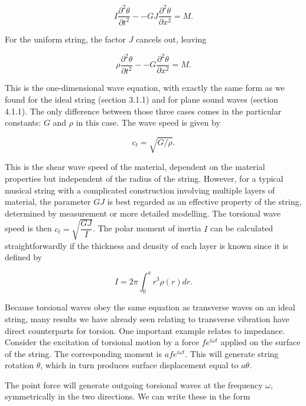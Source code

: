  \begin{equation*}I \dfrac{\partial^2 \theta}{\partial t^2} -- GJ 
  \dfrac{\partial^2 \theta}{\partial x^2}= M . \tag{3}\end{equation*} 

  For the uniform string, the factor $J$ cancels out, leaving 

  \begin{equation*}\rho \dfrac{\partial^2 \theta}{\partial t^2} -- G 
  \dfrac{\partial^2 \theta}{\partial x^2}= M . \tag{4}\end{equation*} 

  This is the one-dimensional wave equation, with exactly the same form as we 
  found for the ideal string (section 3.1.1) and for plane sound waves (section 
  4.1.1). The only difference between those three cases comes in the particular 
  constants: $G$ and $\rho$ in this case. The wave speed is given by 

  \begin{equation*}c_t=\sqrt{G/\rho}. \tag{5}\end{equation*} 

  This is the shear wave speed of the material, dependent on the material 
  properties but independent of the radius of the string. However, for a 
  typical musical string with a complicated construction involving multiple 
  layers of material, the parameter $GJ$ is best regarded as an effective 
  property of the string, determined by measurement or more detailed modelling. 
  The torsional wave speed is then $c_t=\sqrt{\dfrac{GJ}{I}}$. The polar moment 
  of inertia $I$ can be calculated straightforwardly if the thickness and 
  density of each layer is known since it is defined by 

  \begin{equation*}I= 2 \pi \int_0^a{r^3 \rho(r) dr} . \tag{6}\end{equation*} 

  Because torsional waves obey the same equation as transverse waves on an 
  ideal string, many results we have already seen relating to transverse 
  vibration have direct counterparts for torsion. One important example relates 
  to impedance. Consider the excitation of torsional motion by a force $fe^{i 
  \omega t}$ applied on the surface of the string. The corresponding moment is 
  $afe^{i \omega t}$. This will generate string rotation $\theta$, which in 
  turn produces surface displacement equal to $a \theta$. 

  The point force will generate outgoing torsional waves at the frequency 
  $\omega$, symmetrically in the two directions. We can write these in the form 

